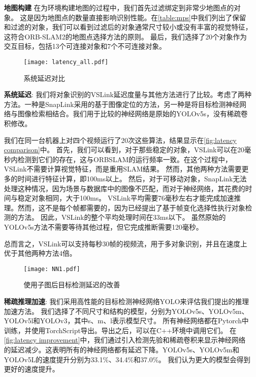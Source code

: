\textbf{地图构建} 
在为环境构建地图的过程中，我们首先过滤绑定到非常少地图点的对象。
这是因为地图点的数量直接影响识别性能。在\autoref{table:mps}中我们列出了保留和过滤的对象，我们可以看到过滤后的对象通常尺寸较小或没有丰富的视觉特征，这符合ORB-SLAM2\cite{mur2017orb}的地图点选择方法的原则。
最后，我们选择了20个对象作为交互目标，包括13个可连接对象和7个不可连接对象。

\begin{figure}[t]
	\centering
	\texttt{[image: latency\_all.pdf]}
	\caption{系统延迟对比}
	\label{fig:latency comparison}
\end{figure}

\textbf{系统延迟}: 
我们将对象识别的VSLink延迟度量与其他方法进行了比较。考虑了两种方法。一种是SnapLink\cite{chen2018snaplink}采用的基于图像定位的方法，另一种是将目标检测神经网络与图像检索相结合。我们用于比较的神经网络是原始的YOLOv5s\cite{glenn_jocher_2020_4154370}，没有稀疏卷积修改。

我们在同一台机器上对四个视频运行了20次这些算法，结果显示在\autoref{fig:latency comparison}中。
首先，我们可以看到，对于那些稳定的对象，VSLink可以在20毫秒内检测到它们的存在，这与ORBSLAM的运行频率一致。在这个过程中，VSLink不需要计算视觉特征，而是重用SLAM结果。
然而，其他两种方法需要更多的时间进行特征计算，即100ms以上。
然后，对于可移动对象，SnapLink无法处理这种情况，因为场景与数据库中的图像不匹配，而对于神经网络，其花费的时间与稳定对象相同，大于100ms。
VSLink平均需要76毫秒左右才能完成加速推理。然而，这不是每个帧都需要的，因为\cite{yao2020video}已经提出了基于帧变化选择性执行对象检测的方法。
因此，VSLink的整个平均处理时间在33ms以下。
虽然原始的YOLOv5s方法不需要等待其他过程，但它完成推断需要120毫秒。
 
总而言之，VSLink可以支持每秒30帧的视频流，用于多对象识别，并且在速度上优于其他两种方法$4$倍。

\begin{figure}[t]
	\centering
	\texttt{[image: NN1.pdf]}
	\caption{使用子图后目标检测延迟的改善}
	\label{fig:latency improvement}
\end{figure}

\textbf{稀疏推理加速}:
我们采用高性能的目标检测神经网络YOLO\cite{redmon2016you}来评估我们提出的推理加速方法。
我们选择了不同尺寸和结构的模型，分别为YOLOv5s、YOLOv5m、YOLOv5l和YOLOv3，其中s、m、l表示模型尺寸。
所有神经网络都在Pytorch中训练，并使用TorchScript导出。导出之后，可以在C++环境中调用它们。
在\autoref{fig:latency improvement}中，我们通过引入检测先验和稀疏卷积来显示神经网络的延迟减少。这表明所有的神经网络都有延迟下降。YOLOv5s、YOLOv5m和YOLOv5L的速度提升分别为33.1\%、34.4\%和37.0\%。
我们认为更大的模型会得到更好的速度提升。


